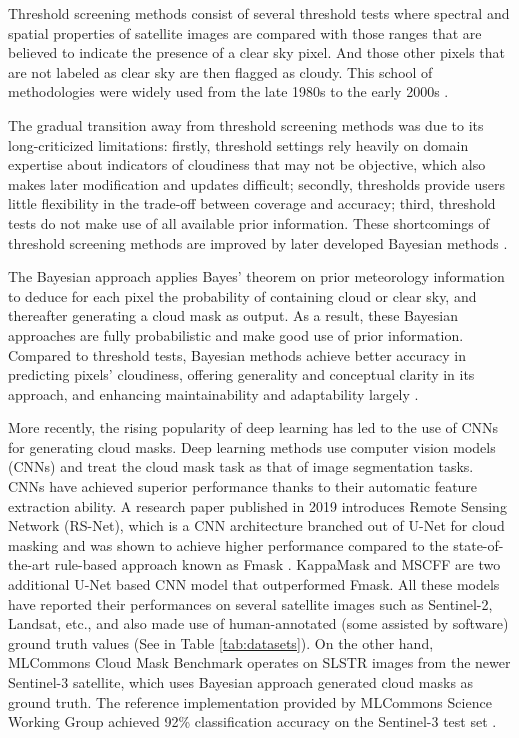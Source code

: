\documentclass[sigplan,screen]{acmart}
\begin{document}
Threshold screening methods consist of several threshold tests where spectral and spatial properties of satellite images are compared with those ranges that are believed to indicate the presence of a clear sky pixel. And those other pixels that are not labeled as clear sky are then flagged as cloudy. This school of methodologies were widely used from the late 1980s to the early 2000s \cite{Merchant2005ProbabilisticPB}. 

The gradual transition away from threshold screening methods was due to its long-criticized limitations: firstly, threshold settings rely heavily on domain expertise about indicators of cloudiness that may not be objective, which also makes later modification and updates difficult; secondly, thresholds provide users little flexibility in the trade-off between coverage and accuracy; third, threshold tests do not make use of all available prior information. These shortcomings of threshold screening methods are improved by later developed Bayesian methods \cite{Merchant2005ProbabilisticPB}.

The Bayesian approach applies Bayes' theorem on prior meteorology information to deduce for each pixel the probability of containing cloud or clear sky, and thereafter generating a cloud mask as output. As a result, these Bayesian approaches are fully probabilistic and make good use of prior information. Compared to threshold tests, Bayesian methods achieve better accuracy in predicting pixels' cloudiness, offering generality and conceptual clarity in its approach, and enhancing maintainability and adaptability largely \cite{Merchant2005ProbabilisticPB}. 

More recently, the rising popularity of deep learning has led to the use of CNNs for generating cloud masks. Deep learning methods \cite{Li2019DeepLB,Domnich2021KappaMaskAC,Yan2018CloudAC,WIELAND2019111203,JEPPESEN2019247} use computer vision models (CNNs) and treat the cloud mask task as that of image segmentation tasks. CNNs have achieved superior performance thanks to their automatic feature extraction ability. A research paper published in 2019 \cite{JEPPESEN2019247} introduces Remote Sensing Network (RS-Net), which is a CNN architecture branched out of U-Net \cite{Ronneberger2015UNetCN} for cloud masking and was shown to achieve higher performance compared to the state-of-the-art rule-based approach known as Fmask \cite{Zhu2012ObjectbasedCA}. KappaMask \cite{Domnich2021KappaMaskAC} and MSCFF \cite{Li2019DeepLB} are two additional U-Net based CNN model that outperformed Fmask. All these models have reported their performances on several satellite images such as Sentinel-2, Landsat, etc., and also made use of human-annotated (some assisted by software) ground truth values (See in Table \ref{tab:datasets}). On the other hand, MLCommons Cloud Mask Benchmark operates on SLSTR images from the newer Sentinel-3 satellite, which uses Bayesian approach generated cloud masks as ground truth. The reference implementation provided by MLCommons Science Working Group achieved 92\% classification accuracy on the Sentinel-3 test set \cite{Thiyagalingam2022AIBF}.
\end{document}
